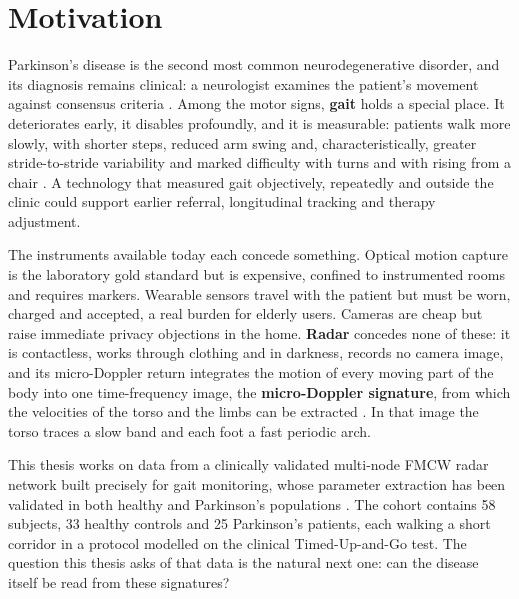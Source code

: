 
\section{Motivation}
\label{sec:motivation}

Parkinson's disease is the second most common neurodegenerative disorder,
and its diagnosis remains clinical: a neurologist examines the patient's
movement against consensus criteria \cite{postuma2015}. Among the motor
signs, \textbf{gait} holds a special place. It deteriorates early, it
disables profoundly, and it is measurable: patients walk more slowly, with
shorter steps, reduced arm swing and, characteristically, greater
stride-to-stride variability and marked difficulty with turns and with
rising from a chair \cite{mirelman2019,hausdorff2009}. A technology that
measured gait objectively, repeatedly and outside the clinic could support
earlier referral, longitudinal tracking and therapy adjustment.

The instruments available today each concede something. Optical motion
capture is the laboratory gold standard but is expensive, confined to
instrumented rooms and requires markers. Wearable sensors travel with the
patient but must be worn, charged and accepted, a real burden for elderly
users. Cameras are cheap but raise immediate privacy objections in the
home. \textbf{Radar} concedes none of these: it is contactless, works
through clothing and in darkness, records no camera image, and its
micro-Doppler return integrates the motion of every moving part of the body
into one time-frequency image, the \textbf{micro-Doppler signature}, from
which the velocities of the torso and the limbs can be extracted
\cite{seifert2020,gurbuz2024}. In that image the torso traces a slow band
and each foot a fast periodic arch.

This thesis works on data from a clinically validated multi-node FMCW radar
network built precisely for gait monitoring, whose parameter extraction has
been validated in both healthy and Parkinson's populations
\cite{lopezdelgado2026}. The cohort contains 58 subjects, 33 healthy
controls and 25 Parkinson's patients, each walking a short corridor in a
protocol modelled on the clinical Timed-Up-and-Go test. The question this
thesis asks of that data is the natural next one: can the disease itself be
read from these signatures?

